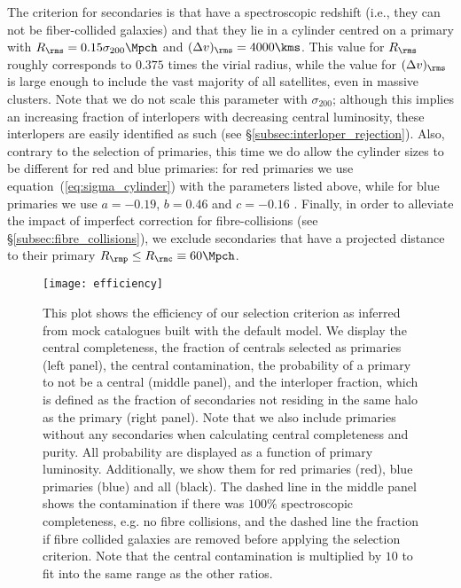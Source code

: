 \documentclass[fleqn,usenatbib,useAMS]{mnras}
\begin{document}
	The criterion for secondaries is that have a spectroscopic redshift (i.e., they can not be fiber-collided galaxies) and that they lie in a cylinder centred on a primary with $R_\rms = 0.15 \sigma_{200} \Mpch$ and $(\Delta v)_\rms = 4000 \kms$. This value for $R_\rms$ roughly corresponds to $0.375$ times the virial radius, while the value for $(\Delta v)_\rms$ is large enough to include the vast majority of all satellites, even in massive clusters. Note that we do not scale this parameter with $\sigma_{200}$; although this implies an increasing fraction of interlopers with decreasing central luminosity, these interlopers are easily identified as such (see \S\ref{subsec:interloper_rejection}). Also, contrary to the selection of primaries, this time we do allow the cylinder sizes to be different for red and blue primaries: for red primaries we use equation~(\ref{eq:sigma_cylinder}) with the parameters listed above, while for blue primaries we use $a = -0.19$, $b = 0.46$ and $c = -0.16$ \citep[see][]{More+11}. Finally, in order to alleviate the impact of  imperfect correction for fibre-collisions (see \S\ref{subsec:fibre_collisions}), we exclude secondaries that have a projected distance to their primary $R_\rmp \leq R_\rmc \equiv 60 \Mpch$.
	\begin{figure*}
		\centering
		\texttt{[image: efficiency]}
		\caption{This plot shows the efficiency of our selection criterion as inferred from mock catalogues built with the default model. We display the central completeness, the fraction of centrals selected as primaries (left panel), the central contamination, the probability of a primary to not be a central (middle panel), and the interloper fraction, which is defined as the fraction of secondaries not residing in the same halo as the primary (right panel). Note that we also include primaries without any secondaries when calculating central completeness and purity. All probability are displayed as a function of primary luminosity. Additionally, we show them for red primaries (red), blue primaries (blue) and all (black). The dashed line in the middle panel shows the contamination if there was $100\%$ spectroscopic completeness, e.g. no fibre collisions, and the dashed line the fraction if fibre collided galaxies are removed before applying the selection criterion. Note that the central contamination is multiplied by $10$ to fit into the same range as the other ratios.}
		\label{fig:efficiency}
	\end{figure*}
	
\end{document}
